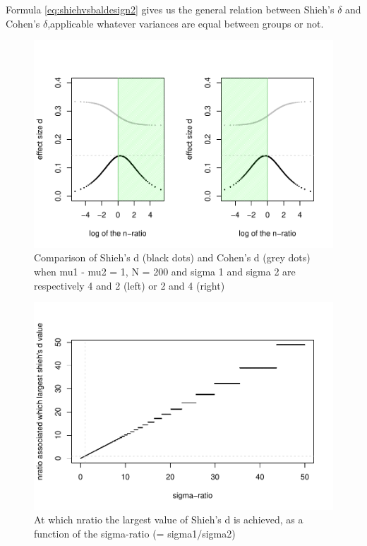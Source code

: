 \documentclass[
  man]{apa6}
\begin{document}
Formula \ref{eq:shiehvsbaldesign2} gives us the general relation between Shieh's \(\delta\) and Cohen's \(\delta\),applicable whatever variances are equal between groups or not.

\begin{figure}
\centering
\includegraphics{Appendix1_files/figure-latex/SHIEH4-1.pdf}
\caption{\label{fig:SHIEH4}Comparison of Shieh's d (black dots) and Cohen's d (grey dots) when mu1 - mu2 = 1, N = 200 and sigma 1 and sigma 2 are respectively 4 and 2 (left) or 2 and 4 (right)}
\end{figure}

\begin{figure}
\centering
\includegraphics{Appendix1_files/figure-latex/SHIEH5-1.pdf}
\caption{\label{fig:SHIEH5}At which nratio the largest value of Shieh's d is achieved, as a function of the sigma-ratio (= sigma1/sigma2)}
\end{figure}
\end{document}

